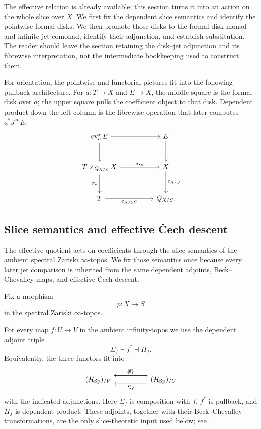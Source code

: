 The effective relation is already available; this section turns it into an
action on the whole slice over \(X\). We first fix the dependent slice
semantics and identify the pointwise formal disks. We then promote those disks
to the formal-disk monad and infinite-jet comonad, identify their adjunction,
and establish substitution. The reader should leave the section retaining the
disk--jet adjunction and its fibrewise interpretation, not the intermediate
bookkeeping used to construct them.

For orientation, the pointwise and functorial pictures fit into the following
pullback architecture. For \(a:T\to X\) and \(E\to X\), the middle square is
the formal disk over \(a\); the upper square pulls the coefficient object to
that disk. Dependent product down the left column is the fibrewise operation
that later computes \(a^*J^\infty E\).
\[
\begin{tikzcd}[column sep=huge,row sep=large]
\operatorname{ev}_a^*E
  \ar[r]
  \ar[d]
&
E
  \ar[d]
\\
T\times_{Q_{X/S}}X
  \ar[r,"\operatorname{ev}_a"]
  \ar[d,"\pi_a"']
&
X
  \ar[d,"e_{X/S}"]
\\
T
  \ar[r,"e_{X/S}a"']
&
Q_{X/S}.
\end{tikzcd}
\]
\subsection{Slice semantics and effective \v{C}ech descent}
\label{sec:jets-ambient-slices}

The effective quotient acts on coefficients through the slice semantics of the
ambient spectral Zariski \(\infty\)-topos. We fix those semantics once because
every later jet comparison is inherited from the same dependent adjoints,
Beck--Chevalley maps, and effective \v{C}ech descent.

Fix a morphism
\[
  p:X\longrightarrow S
\]
in the spectral Zariski \(\infty\)-topos.

For every map \(f:U\to V\) in the ambient infinity-topos we use the dependent
adjoint triple
\[
  \Sigma_f\dashv f^*\dashv\Pi_f.
\]
Equivalently, the three functors fit into
\[
\begin{tikzcd}[column sep=huge]
(\mathcal H_{\Sp})_{/V}
  \ar[r,shift left=1.4ex,"f^*"]
&
(\mathcal H_{\Sp})_{/U}
  \ar[l,shift left=1.4ex,"\Sigma_f"]
  \ar[l,shift right=1.4ex,"\Pi_f"']
\end{tikzcd}
\]
with the indicated adjunctions. Here \(\Sigma_f\) is composition with \(f\),
\(f^*\) is pullback, and \(\Pi_f\) is dependent product. These adjoints, together
with their Beck--Chevalley transformations, are the only slice-theoretic input
used below; see \cite{LurieHTT}.

